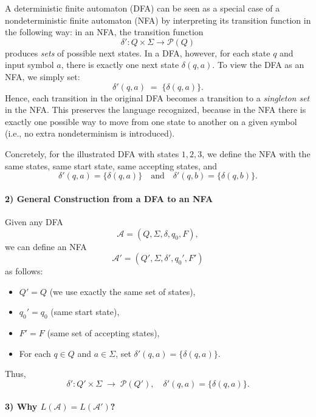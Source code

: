 \documentclass{article}
\begin{document}
A deterministic finite automaton (DFA) can be seen as a special case of a nondeterministic finite automaton (NFA) by interpreting its transition function in the following way: in an NFA, the transition function 
\[
\delta': Q \times \Sigma \to \mathcal{P}(Q)
\]
produces \emph{sets} of possible next states. In a DFA, however, for each state $q$ and input symbol $a$, there is exactly one next state $\delta(q,a)$. To view the DFA as an NFA, we simply set:
\[
\delta'(q,a) \;=\; \{\delta(q,a)\}.
\]
Hence, each transition in the original DFA becomes a transition to a \emph{singleton set} in the NFA. This preserves the language recognized, because in the NFA there is exactly one possible way to move from one state to another on a given symbol (i.e., no extra nondeterminism is introduced).

Concretely, for the illustrated DFA with states $1,2,3$, we define the NFA with the same states, same start state, same accepting states, and 
\[
\delta'(q,a) = \{\delta(q,a)\}\quad\text{and}\quad
\delta'(q,b) = \{\delta(q,b)\}.
\]

\paragraph*{2) General Construction from a DFA to an NFA}

Given any DFA 
\[
\mathcal{A} = (Q, \Sigma, \delta, q_0, F),
\]
we can define an NFA
\[
\mathcal{A}' = (Q', \Sigma, \delta', q_0', F')
\]
as follows:
\begin{itemize}
\item $Q' = Q$ (we use exactly the same set of states),
\item $q_0' = q_0$ (same start state),
\item $F' = F$ (same set of accepting states),
\item For each $q \in Q$ and $a \in \Sigma$, set $\delta'(q,a) = \{\delta(q,a)\}$. 
\end{itemize}
Thus,
\[
\delta': Q' \times \Sigma \;\to\; \mathcal{P}(Q'), 
\quad
\delta'(q,a) = \bigl\{\delta(q,a)\bigr\}.
\]

\paragraph*{3) Why $L(\mathcal{A}) = L(\mathcal{A}')$?}
\end{document}
